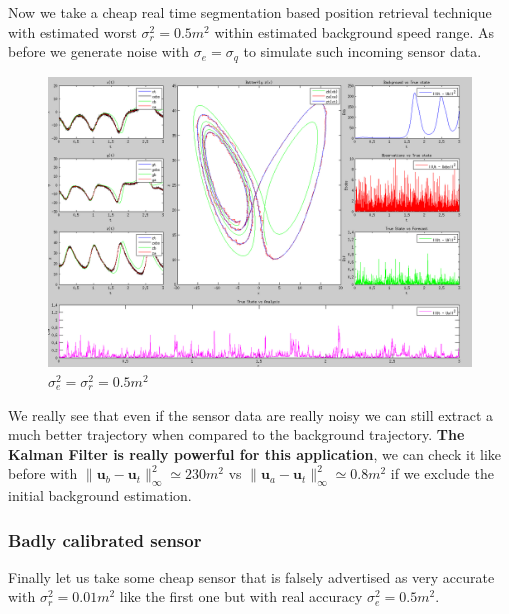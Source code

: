 \documentclass[11pt,a4paper]{article}
\renewcommand{\norm}[1]{\lVert #1 \rVert}
\renewcommand{\u} {\mathbf{u}}
\begin{document}
\vskip 0.3cm
Now we take a cheap real time segmentation based position retrieval technique with estimated worst $\sigma_r^2 = 0.5m^2$ within estimated background speed range. As before we generate noise with $\sigma_e = \sigma_q$ to simulate such incoming sensor data.

\vskip 0.5cm
\begin{figure}[H]
   \includegraphics[width=16cm]{Q11b.png}
   \caption{$\sigma_e^2 = \sigma_r^2 = 0.5m^2$}
\end{figure}
\vskip 0.5cm

We really see that even if the sensor data are really noisy we can still extract a much better trajectory when compared to the background trajectory. 
\textbf{The Kalman Filter is really powerful for this application}, we can check it like before with $\norm{\u_b - \u_t}_{\infty}^2 \simeq 230 m^2$ vs $\norm{\u_a - \u_t}_{\infty}^2 \simeq 0.8 m^2$ if we exclude the initial background estimation.

\clearpage
\subsubsection{Badly calibrated sensor}

\vskip 0.3cm
Finally let us take some cheap sensor that is falsely advertised as very accurate with $\sigma_r^2 = 0.01 m^2$ like the first one but with real accuracy $\sigma_e^2 = 0.5m^2$.
\end{document}
